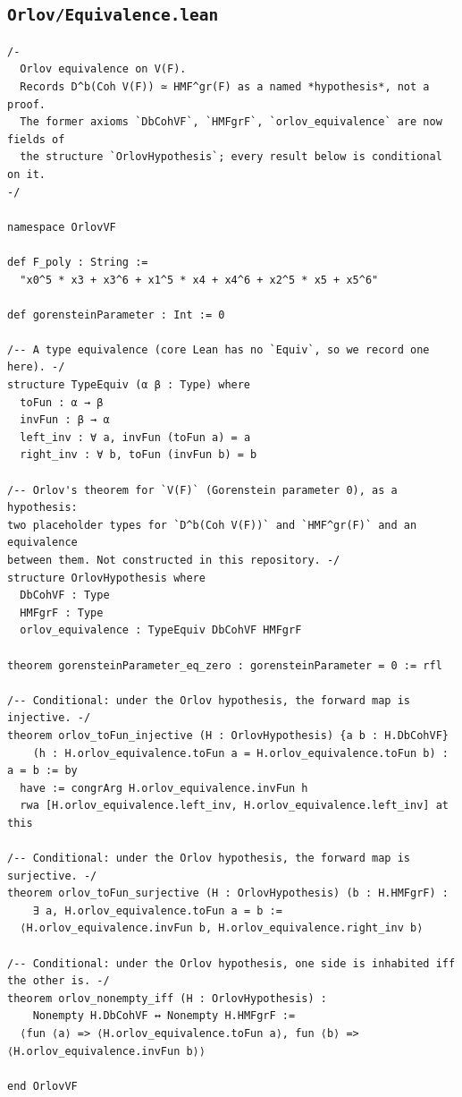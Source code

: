 \documentclass[11pt]{amsart}
\theoremstyle{definition}
\theoremstyle{remark}
\begin{document}
\subsection*{\texttt{Orlov/Equivalence.lean}}
\begin{verbatim}
/-
  Orlov equivalence on V(F).
  Records D^b(Coh V(F)) ≃ HMF^gr(F) as a named *hypothesis*, not a proof.
  The former axioms `DbCohVF`, `HMFgrF`, `orlov_equivalence` are now fields of
  the structure `OrlovHypothesis`; every result below is conditional on it.
-/

namespace OrlovVF

def F_poly : String :=
  "x0^5 * x3 + x3^6 + x1^5 * x4 + x4^6 + x2^5 * x5 + x5^6"

def gorensteinParameter : Int := 0

/-- A type equivalence (core Lean has no `Equiv`, so we record one here). -/
structure TypeEquiv (α β : Type) where
  toFun : α → β
  invFun : β → α
  left_inv : ∀ a, invFun (toFun a) = a
  right_inv : ∀ b, toFun (invFun b) = b

/-- Orlov's theorem for `V(F)` (Gorenstein parameter 0), as a hypothesis:
two placeholder types for `D^b(Coh V(F))` and `HMF^gr(F)` and an equivalence
between them. Not constructed in this repository. -/
structure OrlovHypothesis where
  DbCohVF : Type
  HMFgrF : Type
  orlov_equivalence : TypeEquiv DbCohVF HMFgrF

theorem gorensteinParameter_eq_zero : gorensteinParameter = 0 := rfl

/-- Conditional: under the Orlov hypothesis, the forward map is injective. -/
theorem orlov_toFun_injective (H : OrlovHypothesis) {a b : H.DbCohVF}
    (h : H.orlov_equivalence.toFun a = H.orlov_equivalence.toFun b) : a = b := by
  have := congrArg H.orlov_equivalence.invFun h
  rwa [H.orlov_equivalence.left_inv, H.orlov_equivalence.left_inv] at this

/-- Conditional: under the Orlov hypothesis, the forward map is surjective. -/
theorem orlov_toFun_surjective (H : OrlovHypothesis) (b : H.HMFgrF) :
    ∃ a, H.orlov_equivalence.toFun a = b :=
  ⟨H.orlov_equivalence.invFun b, H.orlov_equivalence.right_inv b⟩

/-- Conditional: under the Orlov hypothesis, one side is inhabited iff the other is. -/
theorem orlov_nonempty_iff (H : OrlovHypothesis) :
    Nonempty H.DbCohVF ↔ Nonempty H.HMFgrF :=
  ⟨fun ⟨a⟩ => ⟨H.orlov_equivalence.toFun a⟩, fun ⟨b⟩ => ⟨H.orlov_equivalence.invFun b⟩⟩

end OrlovVF
\end{verbatim}
\end{document}
